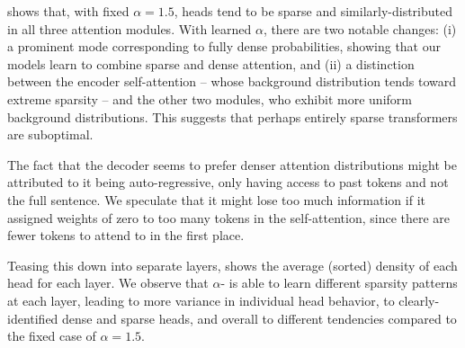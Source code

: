 \begin{sloppypar}
     shows that, with fixed $\alpha=1.5$, heads
    tend to be sparse and similarly-distributed in all three attention
    modules. With learned $\alpha$, there are two notable changes: (i) a
    prominent mode corresponding to fully dense probabilities, showing
    that our models learn to combine sparse and dense attention, and (ii)
    a distinction between the encoder self-attention -- whose background
    distribution tends toward extreme sparsity -- and the other two
    modules, who exhibit more uniform background distributions. This
    suggests that perhaps entirely sparse transformers are suboptimal.
\end{sloppypar}

The fact that the decoder seems to prefer denser attention
distributions might be attributed to it being auto-regressive, only
having access to past tokens and not the full sentence. We speculate
that it might lose too much information if it assigned weights of
zero to too many tokens in the self-attention, since there are fewer
tokens to attend to in the first place.

Teasing this down into separate layers,
 shows the average (sorted) density of
each head for each layer. We observe that $\alpha$-\entmaxtext{} is
able to learn different sparsity patterns at each layer, leading to
more variance in individual head behavior, to clearly-identified
dense and sparse heads, and overall to different tendencies compared
to the fixed case of $\alpha=1.5$.

